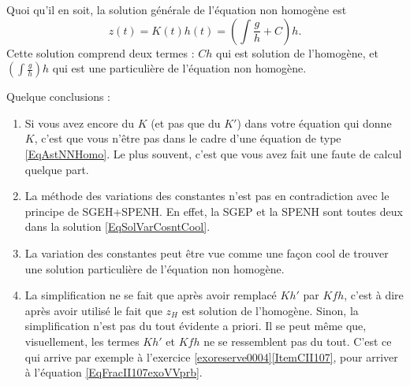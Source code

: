 Quoi qu'il en soit, la solution générale de l'équation non homogène est
\begin{equation}        \label{EqSolVarCosntCool}
    z(t)=K(t)h(t)=\left( \int\frac{ g }{ h }+C \right)h.
\end{equation}
Cette solution comprend deux termes : $Ch$ qui est solution de l'homogène, et $\left( \int \frac{ g }{ h } \right)h$ qui est une particulière de l'équation non homogène.

Quelque conclusions :

\begin{enumerate}
\item
Si vous avez encore du $K$ (et pas que du $K'$) dans votre équation qui donne $K$, c'est que vous n'être pas dans le cadre d'une équation de type \eqref{EqAstNNHomo}. Le plus souvent, c'est que vous avez fait une faute de calcul quelque part.

\item
La méthode des variations des constantes n'est pas en contradiction avec le principe de \og SGEH+SPENH\fg. En effet, la SGEP et la SPENH sont toutes deux dans la solution \eqref{EqSolVarCosntCool}.

\item
La variation des constantes peut être vue comme une façon cool de trouver une solution particulière de l'équation non homogène.

\item
La simplification ne se fait que après avoir remplacé $Kh'$ par $Kfh$, c'est à dire après avoir utilisé le fait que $z_H$ est solution de l'homogène. Sinon, la simplification n'est pas du tout évidente a priori. Il se peut même que, visuellement, les termes $Kh'$ et $Kfh$ ne se ressemblent pas du tout. C'est ce qui arrive par exemple à l'exercice \ref{exoreserve0004}\ref{ItemCII107}, pour arriver à l'équation \eqref{EqFracII107exoVVprb}.

\end{enumerate}

